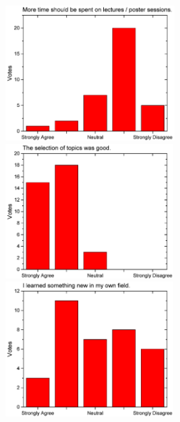 \begin{figure}[H]
\begin{minipage}{.48\linewidth}
      {\includegraphics[height=50mm]{figures/n/Graph12.pdf}}
      {\includegraphics[height=50mm]{figures/n/Graph13.pdf}}
      {\includegraphics[height=50mm]{figures/n/Graph14.pdf}}
  \end{minipage}
\end{figure}


